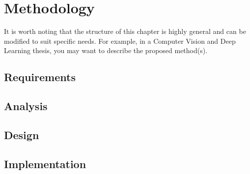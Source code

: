\chapter{Methodology}

It is worth noting that the structure of this chapter is highly general and can be modified to suit specific needs. For example, in a Computer Vision and Deep Learning thesis, you may want to describe the proposed method(s).

\section{Requirements}

\lipsum  %

\section{Analysis}

\lipsum  %

\section{Design}

\lipsum  %

\section{Implementation}

\lipsum  %
